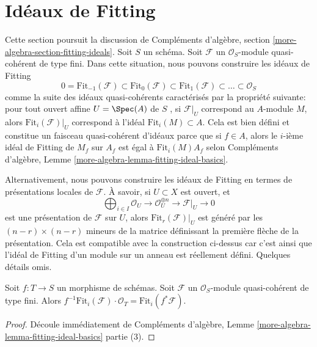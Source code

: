 \section{Idéaux de Fitting}
\label{section-fitting-ideals}

\noindent
Cette section poursuit la discussion de Compléments d'algèbre,
section  \ref{more-algebra-section-fitting-ideals}. Soit  $S$  un schéma. Soit  $\mathcal{F}$  un
 $\mathcal{O}_S$-module quasi-cohérent de type fini. Dans cette situation, nous
pouvons construire les idéaux de Fitting
$$
0 = \text{Fit}_{-1}(\mathcal{F}) \subset \text{Fit}_0(\mathcal{F}) \subset
\text{Fit}_1(\mathcal{F}) \subset \ldots \subset \mathcal{O}_S
$$
comme la suite des idéaux quasi-cohérents caractérisés par la propriété suivante:
pour tout ouvert affine  $U = \Spec(A)$  de  $S$ , si  $\mathcal{F}|_U$  correspond
au  $A$-module  $M$, alors  $\text{Fit}_i(\mathcal{F})|_U$  correspond à l'idéal
 $\text{Fit}_i(M) \subset A$. Cela est bien défini et constitue un faisceau quasi-cohérent
d'idéaux parce que si  $f \in A$, alors le  $i$-ième idéal de Fitting de
 $M_f$  sur  $A_f$  est égal à  $\text{Fit}_i(M) A_f$  selon Compléments d'algèbre, Lemme
 \ref{more-algebra-lemma-fitting-ideal-basics}.

\medskip\noindent
Alternativement, nous pouvons construire les idéaux de Fitting en termes de
présentations locales de  $\mathcal{F}$. À savoir, si  $U \subset X$  est ouvert, et
$$
\bigoplus\nolimits_{i \in I} \mathcal{O}_U \to
\mathcal{O}_U^{\oplus n} \to \mathcal{F}|_U \to 0
$$
est une présentation de  $\mathcal{F}$  sur  $U$, alors  $\text{Fit}_r(\mathcal{F})|_U$  est
généré par les  $(n - r) \times (n - r)$ mineurs de la matrice définissant la première flèche
de la présentation. Cela est compatible avec la construction ci-dessus car c'est
ainsi que l'idéal de Fitting d'un module sur un anneau est réellement défini.
Quelques détails omis.

\begin{lemma}
\label{lemma-base-change-fitting-ideal}
Soit  $f : T \to S$  un morphisme de schémas. Soit  $\mathcal{F}$  un
 $\mathcal{O}_S$-module quasi-cohérent de type fini. Alors  $f^{-1}\text{Fit}_i(\mathcal{F}) \cdot \mathcal{O}_T =
\text{Fit}_i(f^*\mathcal{F})$.
\end{lemma}

\begin{proof}
Découle immédiatement de Compléments d'algèbre, Lemme  \ref{more-algebra-lemma-fitting-ideal-basics}  partie (3).
\end{proof}

